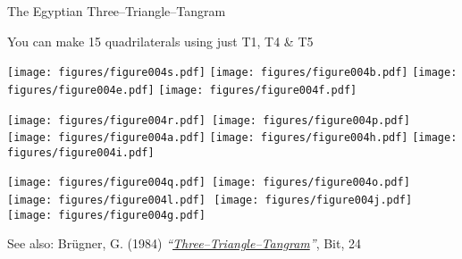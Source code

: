 \documentclass[14pt]{beamer}
\begin{document}

    \begin{frame}{The Egyptian Three--Triangle--Tangram}
        \begin{center}
            You can make 15 quadrilaterals using just T1, T4 \& T5

            \bigskip \bigskip

            \texttt{[image: figures/figure004s.pdf]}\quad
            \quad
            \texttt{[image: figures/figure004b.pdf]}\quad
            \texttt{[image: figures/figure004e.pdf]}\quad
            \texttt{[image: figures/figure004f.pdf]}\\

            \bigskip \bigskip

            \texttt{[image: figures/figure004r.pdf]}\quad\,
            \texttt{[image: figures/figure004p.pdf]}\quad
            \texttt{[image: figures/figure004a.pdf]}\quad
            \texttt{[image: figures/figure004h.pdf]}\quad
            \texttt{[image: figures/figure004i.pdf]}\!\\

            \bigskip \bigskip

            \texttt{[image: figures/figure004q.pdf]}\quad\;\,
            \texttt{[image: figures/figure004o.pdf]}\quad
            \texttt{[image: figures/figure004l.pdf]}\quad\,\,
            \texttt{[image: figures/figure004j.pdf]}\quad\;\,
            \texttt{[image: figures/figure004g.pdf]}\phantom{.}\\

            \bigskip \bigskip

            {\footnotesize See also: Brügner, G. (1984) \emph{``\href{https://doi.org/10.1007/BF02136037}{Three--Triangle--Tangram}''}, Bit, 24}
        \end{center}
    \end{frame}

\end{document}
